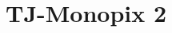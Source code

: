 
\begin{comment}

Intro should stress: 
1. why the characterizazion of TJMP2 is so important for the upgrade project (OBELIX will have the same matrix analog/readout of TJMP2 + changes in the periphery to implement the trigger logic and memories for application in Belle II)

4. Explored also different registers settings to operate the chip with lower THResholds
 	- important after radiation damage to run at low THR to keep the hit efficiency high
5. Discovered & investigated an important issue with cross talk, due to digital signal from the redout, showing up when running the chip with THR below ~ 250 e- 
hot pixel studied to understand which digital signal was responsible & mitigate the effect with different settings/bias



Sections of this chapter could be: 
1. Matrix and flavour
2. Threshold and noise: 
	S curve internal injection, results with TB settings
	Threshold dispersion and tuning 
	Results from measurements done later (Ludovico talk TREDI) 
3. TOT calibration with internal injection 
	Also add the issue with injection circuit but not too much emphasis. 
4. Response to radioactive source and absolute calibration
5. Operation with low threshold 
	Explain the function of the various registers used (see Eleonora thesis, and maybe can add also some scope picture). 
	Register optimization 
	Comparison with simulation 
	Can add at the end some nice picture of the optimized thr and tuning 
6. Cross talk issue and mitigation 
	Description of the issue tests done and plans to mitigate it in OBELIX
7. TB June 2022 results
	prospettive del TB 2023
\end{comment}



\chapter{TJ-Monopix 2}

